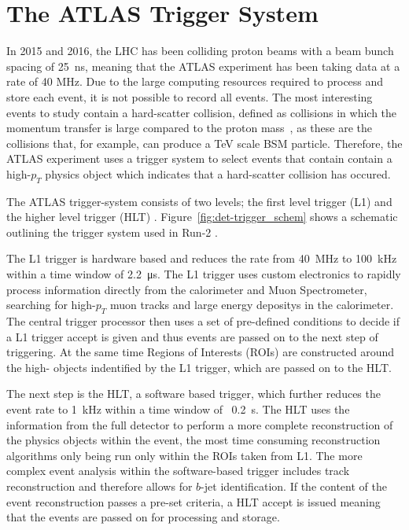 \chapter{The ATLAS Trigger System}
\label{sec:trig}

In 2015 and 2016, the LHC has been colliding proton beams with a beam bunch spacing of \SI{25}{\nano\second},
meaning that the ATLAS experiment has been taking data at a rate of 40 MHz.
Due to the large computing resources required to process and store each event,
it is not possible to record all events.
The most interesting events to study contain a hard-scatter collision,
defined as collisions in which the momentum transfer is large compared to the proton mass~\cite{trig-hard_scatter},
as these are the collisions that, for example, can produce a TeV scale BSM particle.
Therefore, the ATLAS experiment uses a trigger system to select events that contain
contain a high-$p_{T}$ physics object which indicates that a hard-scatter collision has occured.

The ATLAS trigger-system consists of two levels;
the first level trigger (L1) and the higher level trigger (HLT) \cite{det-run2_trigger}.
Figure~\ref{fig:det-trigger_schem} shows a schematic outlining the trigger system used in Run-2 \cite{det-run2_triggerPerf}. 

The L1 trigger is hardware based and reduces the rate from 40~MHz to 100~kHz within a time window of \SI{2.2}{\micro\second}.
The L1 trigger uses custom electronics to rapidly process information directly from the
calorimeter and Muon Spectrometer, searching for high-$p_{T}$ muon tracks and large energy depositys in the calorimeter.
The central trigger processor then uses a set of pre-defined conditions
to decide if a L1 trigger accept is given and thus events are passed on to the next step of triggering.
At the same time Regions of Interests (ROIs) are constructed around the high-\pT{} objects indentified by the L1 trigger, which are passed on to the HLT. 

The next step is the HLT, a software based trigger,
which further reduces the event rate to 1~kHz within a time window of ~\SI{0.2}{\second}.
The HLT uses the information from the full detector
to perform a more complete reconstruction of the physics objects within the event,
the most time consuming reconstruction algorithms only being run only within the ROIs taken from L1.
The more complex event analysis within the software-based trigger includes
track reconstruction and therefore allows for $b$-jet identification.
If the content of the event reconstruction passes a pre-set criteria, a HLT accept is issued
meaning that the events are passed on for processing and storage. 

